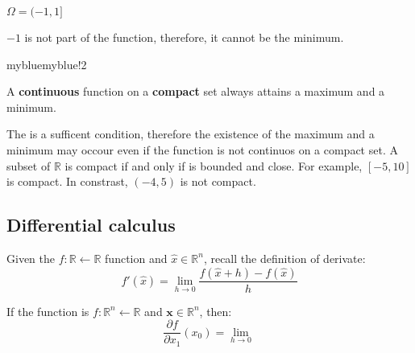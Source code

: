 \begin{minipage}{0.33\linewidth}
    \centering
    \begin{center}
        \( \Omega = (-1, 1] \)

        \begin{adjustwidth}{0.05\linewidth}{0.05\linewidth}
            \( -1 \) is not part of the function, therefore, it cannot be the minimum.
        \end{adjustwidth}
   \end{center}
\end{minipage}

\begin{remark}{myblue}{myblue!2}
    \begin{theorem}[Weierstrass]
        A \textbf{continuous} function on a \textbf{compact} set always attains a  maximum and a minimum.
        \label{tehorem:weierstrass}
    \end{theorem}
\end{remark}



The  is a sufficent condition, therefore the existence of the maximum and a minimum may occour even if the function is not continuos on a compact set. A subset of \( \mathbb{R} \) is compact if and only if is bounded and close. For example, \( [-5, 10] \) is compact. In constrast, \( (-4, 5) \) is not compact.

\subsection{Differential calculus}

Given the \( f : \mathbb{R} \leftarrow \mathbb{R} \) function and \( \widehat{x} \in \mathbb{R}^n \), recall the definition of derivate:
\[
    f'(\widehat{x}) = \lim_{h \rightarrow 0} \frac{f(\widehat{x} + h) - f(\widehat{x})}{h}
\]

If the function is \( f: \mathbb{R}^n \leftarrow \mathbb{R} \) and \( \mathbf{x} \in \mathbb{R}^n \), then:
\[
    \frac{\partial f}{\partial x_1}(x_0) = \lim_{h \rightarrow 0}\frac{}{}
\]